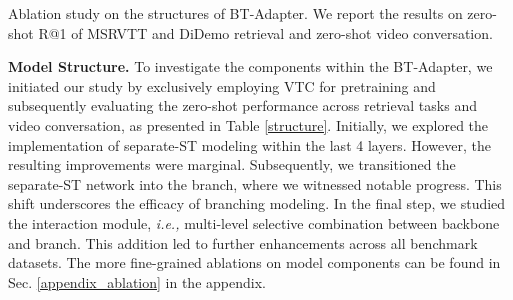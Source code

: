 \documentclass{article} \usepackage{iclr2024_conference,times}
\begin{document}
\begin{table}[ht]
  \begin{minipage}[b]{0.58\textwidth}
    \centering
    \caption{Ablation study on the structures of BT-Adapter. We report the results on zero-shot R@1 of MSRVTT and DiDemo retrieval and zero-shot video conversation.}
\vspace{-0.8em}
\vspace{-0.5em}
\label{structure}
  \end{minipage}\hfill
  \begin{minipage}[b]{0.38\textwidth}
\raggedleft
    \caption{Ablation study on the training objectives. We report the zero-shot R@1 of retrieval.}
\vspace{-0.8em}
\vspace{-0.5em}
\label{objective}
  \end{minipage}
\end{table}

\textbf{Model Structure.} 
To investigate the components within the BT-Adapter, we initiated our study by exclusively employing VTC for pretraining and subsequently evaluating the zero-shot performance across retrieval tasks and video conversation, as presented in Table \ref{structure}. Initially, we explored the implementation of separate-ST modeling within the last 4 layers. However, the resulting improvements were marginal. Subsequently, we transitioned the separate-ST network into the branch, where we witnessed notable progress. This shift underscores the efficacy of branching modeling. In the final step, we studied the interaction module, \textit{i.e.,} multi-level selective combination between backbone and branch. This addition led to further enhancements across all benchmark datasets. The more fine-grained ablations on model components can be found in Sec. \ref{appendix_ablation} in the appendix.
\end{document}
